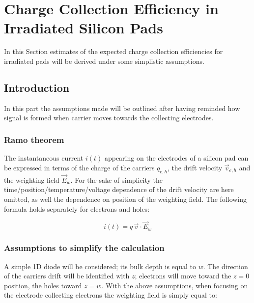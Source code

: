 


\chapter{Charge Collection Efficiency in Irradiated Silicon Pads}
\label{sec:CCEirr}

In this Section estimates of the expected charge collection efficiencies 
for irradiated pads will be derived under some simplistic assumptions.

\section{Introduction}
In this part the assumptions made will be outlined after having reminded how signal is formed when 
carrier moves towards the collecting electrodes.
\subsection{Ramo theorem}
\label{sec:CCEramo}
The instantaneous current $i(t)$ appearing on the electrodes of a silicon pad can be expressed 
in terms of the charge of the carriers $q_{e,h}$, the drift velocity $\vec{v}_{e,h}$  and the 
weighting field $\vec{E}_w$. For the sake of simplicity the time/position/temperature/voltage 
dependence of the drift velocity are here omitted, as well the dependence on position of the 
weighting field.
The following formula holds separately for electrons and holes:

\begin{equation}
i(t) = q\,\vec{v}\cdot\vec{E}_w
\end{equation} 

\subsection{Assumptions to simplify the calculation}
\label{sec:assumptions}
A simple 1D diode will be considered; its bulk depth is equal to $w$. The direction of the carriers 
drift will be identified with $z$; electrons will move toward the $z=0$ position, the holes toward $z=w$.
With the above assumptions, when focusing on the electrode collecting electrons 
the weighting field is simply equal to:

